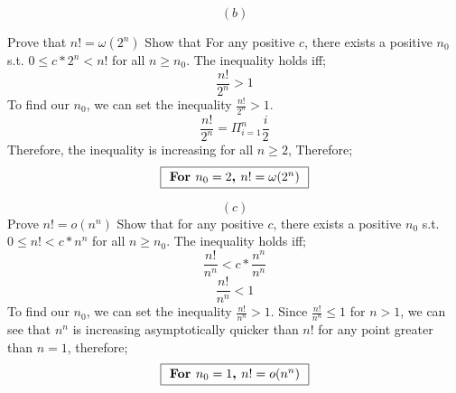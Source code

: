 \documentclass[11pt]{article}
\begin{document}
\begin{enumerate}
\[ (b) \]



Prove that $n! = \omega(2^{n})$
\newline
Show that For any positive $c$, 
\newline 
there exists a positive $n_0$ s.t. $0 \leq c * 2^n < n!$ for all $n \geq n_0$.
\newline 
The inequality holds iff;
\[ \frac{n!}{2^n} > 1 \]
To find our $n_0$, we can set the inequality $\frac{n!}{2^n} > 1$.
\[ \frac{n!}{2^n} = \Pi_{i=1}^{n}\frac{i}{2} \]
Therefore, the inequality is increasing for all $n \geq 2$, Therefore;
\[ \fbox{\textbf{ For $n_0 = 2$, $n! = \omega(2^n)$ }} \]


\[ (c) \]
Prove $n! = o(n^{n})$
\newline
Show that for any positive $c$, 
\newline
there exists a positive $n_0$ s.t. $0 \leq n! < c  * n^{n}$ for all $n \geq n_0$.
\newline 
The inequality holds iff;
\[ \frac{n!}{n^n} < c*\frac{n^n}{n^n} \]
\[ \frac{n!}{n^n} < 1 \]
To find our $n_0$, we can set the inequality $\frac{n!}{n^n} > 1$. 
\newline 
Since $\frac{n!}{n^n} \leq 1$ for $n > 1$, we can see that $n^n$ is increasing asymptotically quicker than $n!$ for any point greater than $n = 1$, therefore; 
\[ \fbox{\textbf{ For $n_0 = 1$, $n! = o(n^n)$ }} \]


\end{enumerate}
\end{document}
